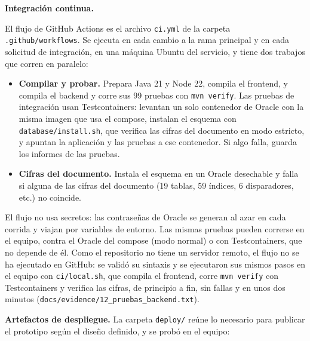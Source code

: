 \textbf{Integración continua.} {\sloppy El flujo de GitHub Actions es el archivo
\texttt{ci.yml} de la carpeta \texttt{.github/workflows}. Se ejecuta en cada cambio a la rama
principal y en cada solicitud de integración, en una máquina Ubuntu del
servicio, y tiene dos trabajos que corren en paralelo:\par}

\begin{itemize}[itemsep=2pt]
  \item \textbf{Compilar y probar.} Prepara Java 21 y Node 22, compila el
        frontend, y compila el backend y corre sus 99 pruebas con
        \texttt{mvn verify}. Las pruebas de integración usan Testcontainers:
        levantan un solo contenedor de Oracle con la misma imagen que usa el
        compose, instalan el esquema con \texttt{database/install.sh}, que verifica
        las cifras del documento en modo estricto, y apuntan la aplicación y las
        pruebas a ese contenedor. Si algo falla, guarda los informes de las
        pruebas.
  \item \textbf{Cifras del documento.} Instala el esquema en un Oracle
        desechable y falla si alguna de las cifras del documento (19 tablas, 59
        índices, 6 disparadores, etc.) no coincide.
\end{itemize}

El flujo no usa secretos: las contraseñas de Oracle se generan al azar en cada
corrida y viajan por variables de entorno. Las mismas pruebas pueden correrse
en el equipo, contra el Oracle del compose (modo normal) o con
Testcontainers, que no depende de él. Como el repositorio no tiene un
servidor remoto, el flujo no se ha ejecutado en GitHub: se validó su sintaxis
y se ejecutaron sus mismos pasos en el equipo con \texttt{ci/local.sh}, que
compila el frontend, corre \texttt{mvn verify} con Testcontainers y verifica las
cifras, de principio a fin, sin fallas y en unos dos minutos
(\texttt{docs/evidence/12\_pruebas\_backend.txt}).

\textbf{Artefactos de despliegue.} La carpeta \texttt{deploy/} reúne lo
necesario para publicar el prototipo según el diseño definido, y se probó en el
equipo:


